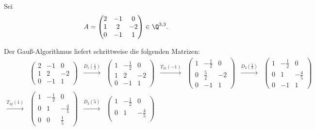 \documentclass[a4paper]{article}
\begin{document}
Sei
\begin{equation*}
    A = \begin{pmatrix}
        2 & -1 & 0  \\
        1 & 2  & -2 \\
        0 & -1 & 1
    \end{pmatrix} \in \Q^{3, 3}.
\end{equation*}

Der Gauß-Algorithmus liefert schrittweise die folgenden Matrizen:
\begin{align*}
     & \begin{pmatrix}
           2 & -1 & 0  \\
           1 & 2  & -2 \\
           0 & -1 & 1
       \end{pmatrix}                    &
    \xrightarrow{D_1(\frac{1}{2})}
     & \begin{pmatrix}
           1 & -\frac{1}{2} & 0  \\
           1 & 2            & -2 \\
           0 & -1           & 1
       \end{pmatrix}           &
    \xrightarrow{T_{21}(-1)}
     & \begin{pmatrix}
           1 & -\frac{1}{2} & 0  \\
           0 & \frac{5}{2}  & -2 \\
           0 & -1           & 1
       \end{pmatrix}           &
    \xrightarrow{D_2(\frac{2}{5})}
     & \begin{pmatrix}
           1 & -\frac{1}{2} & 0            \\
           0 & 1            & -\frac{4}{5} \\
           0 & -1           & 1
       \end{pmatrix}    \\
    \xrightarrow{T_{32}(1)}
     & \begin{pmatrix}
           1 & -\frac{1}{2} & 0            \\
           0 & 1            & -\frac{4}{5} \\
           0 & 0            & \frac{1}{5}
       \end{pmatrix} &
    \xrightarrow{D_3(5)}
     & \begin{pmatrix}
           1 & -\frac{1}{2} & 0            \\
           0 & 1            & -\frac{4}{5} \\

\end{pmatrix}
\end{align*}
\end{document}
